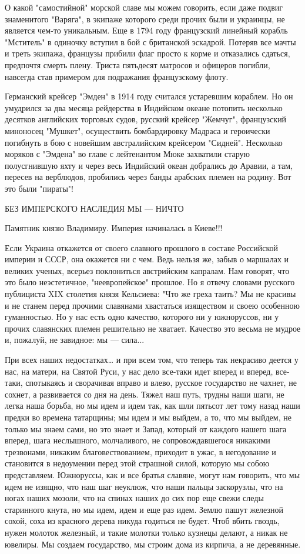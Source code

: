 О какой "самостийной" морской славе мы можем говорить, если даже подвиг
знаменитого "Варяга", в экипаже которого среди прочих были и украинцы, не
является чем-то уникальным. Еще в 1794 году французский линейный корабль
"Мститель" в одиночку вступил в бой с британской эскадрой. Потеряв все мачты и
треть экипажа, французы прибили флаг просто к корме и отказались сдаться,
предпочтя смерть плену. Триста пятьдесят матросов и офицеров погибли, навсегда
став примером для подражания французскому флоту.

Германский крейсер "Эмден" в 1914 году считался устаревшим кораблем. Но он
умудрился за два месяца рейдерства в Индийском океане потопить несколько
десятков английских торговых судов, русский крейсер "Жемчуг", французский
миноносец "Мушкет", осуществить бомбардировку Мадраса и героически погибнуть в
бою с новейшим австралийским крейсером "Сидней". Несколько моряков с "Эмдена"
во главе с лейтенантом Мюке захватили старую полусгнившую яхту и через весь
Индийский океан добрались до Аравии, а там, пересев на верблюдов, пробились
через банды арабских племен на родину. Вот это были "пираты"!

БЕЗ ИМПЕРСКОГО НАСЛЕДИЯ МЫ --- НИЧТО 

Памятник князю Владимиру. Империя начиналась в Киеве!!!

Если Украина откажется от своего славного прошлого в составе Российской империи
и СССР, она окажется ни с чем. Ведь нельзя же, забыв о маршалах и великих
ученых, всерьез поклониться австрийским капралам. Нам говорят, что это было
неэстетичное, "неевропейское" прошлое. Но я отвечу словами русского публициста
XIX столетия князя Кельсиева: "Что же греха таить? Мы не красивы и не станем
перед прочими славянами хвастаться изяществом и своею особенною гуманностью. Но
у нас есть одно качество, которого ни у южноруссов, ни у прочих славянских
племен решительно не хватает. Качество это весьма не мудрое и, пожалуй, не
завидное: мы --- сила...

При всех наших недостатках… и при всем том, что теперь так некрасиво деется у
нас, на матери, на Святой Руси, у нас дело все-таки идет вперед и вперед,
все-таки, спотыкаясь и сворачивая вправо и влево, русское государство не
чахнет, не сохнет, а развивается со дня на день. Тяжел наш путь, трудны наши
шаги, не легка наша борьба, но мы идем и идем так, как шли пятьсот лет тому
назад наши предки во времена татарщины; мы идем и мы выйдем, а то, что мы
выйдем, не только мы знаем сами, но это знает и Запад, который от каждого
нашего шага вперед, шага неслышного, молчаливого, не сопровождавшегося никакими
трезвонами, никаким благовествованием, приходит в ужас, в негодование и
становится в недоумении перед этой страшной силой, которую мы собою
представляем. Южноруссы, как и все братья славяне, могут нам говорить, что мы
идем не изящно, что наш шаг неуклюж, что наши пальцы заскорузлы, что на ногах
наших мозоли, что на спинах наших до сих пор еще свежи следы старинного кнута,
но мы идем, идем и еще раз идем. Землю пашут железной сохой, соха из красного
дерева никуда годиться не будет. Чтоб вбить гвоздь, нужен молоток железный, и
такие молотки только кузнецы делают, а никак не ювелиры. Мы создаем
государство, мы строим дома из кирпича, а не деревянные.

